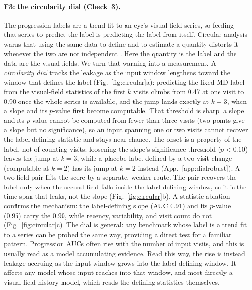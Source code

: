 \paragraph{F3: the circularity dial (Check~3).}
The progression labels are a trend fit to an eye's visual-field series, so feeding that series to predict the label is
predicting the label from itself. Circular analysis warns that using the same data to define and to estimate a quantity
distorts it whenever the two are not independent \citep{kriegeskorte2009circular}. Here the quantity is the label and the
data are the visual fields. We turn that warning into a measurement. A \emph{circularity dial} tracks the leakage as the
input window lengthens toward the window that defines the label (Fig.~\ref{fig:circular}a): predicting the fixed MD label
from the visual-field statistics of the first $k$ visits climbs from \num{0.47} at one visit to
\num{0.90} once the whole series is available, and the jump lands exactly at $k{=}3$, when a slope and its $p$-value
first become computable. That threshold is sharp: a slope and its $p$-value cannot be computed from fewer than three
visits (two points give a slope but no significance), so an input spanning one or two visits cannot recover the
label-defining statistic and stays near chance. The onset is a property of the label, not of counting visits:
loosening the slope's significance threshold ($p<0.10$) leaves the jump at $k{=}3$, while a placebo label defined by a
two-visit change (computable at $k{=}2$) has its jump at $k{=}2$ instead (App.~\ref{app:dialrobust}). A two-field pair
lifts the score by a separate, weaker route. The pair recovers the label only when the second field falls inside the
label-defining window, so it is the time span that leaks, not the slope (Fig.~\ref{fig:circular}b). A statistic
ablation confirms the mechanism: the label-defining slope (AUC \num{0.91}) and its
$p$-value (\num{0.95}) carry the \num{0.90}, while recency, variability, and visit count do not (Fig.~\ref{fig:circular}c).
The dial is general: any benchmark whose label is a trend fit to a series can be probed the same way, providing a direct
test for a familiar pattern. Progression AUCs often rise with the number of input visits, and this is usually read as a model
accumulating evidence. Read this way, the rise is instead leakage accruing as the input window grows into the
label-defining window. It affects any model whose input reaches into that window, and most directly a
visual-field-history model, which reads the defining statistics themselves.

